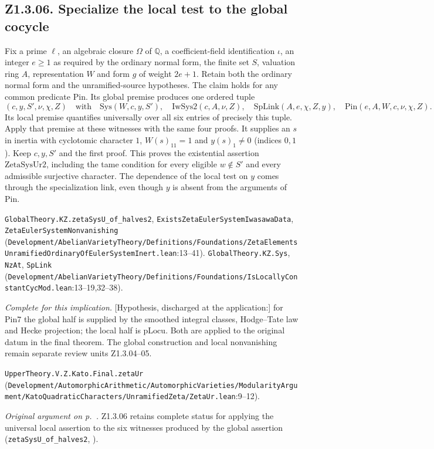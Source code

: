 \subsection{Z1.3.06. Specialize the local test to the global cocycle}\label{r5:Z1.3.06}
Fix a prime $\ell$, an algebraic closure $\Omega$ of $\mathbb Q$, a coefficient-field identification $\iota$, an integer $e\ge1$ as required by the ordinary normal form, the finite set $S$, valuation ring $A$, representation $W$ and form $g$ of weight $2e+1$. Retain both the ordinary normal form and the unramified-source hypotheses. The claim holds for any common predicate $\mathrm{Pin}$. Its global premise produces one ordered tuple
\[
 (c,y,S',\nu,\chi,Z)
 \quad\text{with}\quad
 \mathrm{Sys}(W,c,y,S'),\quad\mathrm{IwSys2}(c,A,\nu,Z),\quad
 \mathrm{SpLink}(A,e,\chi,Z,y),\quad\mathrm{Pin}(e,A,W,c,\nu,\chi,Z).
\]
Its local premise quantifies universally over all six entries of precisely this tuple. Apply that premise at these witnesses with the same four proofs. It supplies an $s$ in inertia with cyclotomic character $1$, $W(s)_{11}=1$ and $y(s)_1\ne0$ (indices $0,1$). Keep $c,y,S'$ and the first proof. This proves the existential assertion $\mathrm{ZetaSysUr2}$, including the tame condition for every eligible $w\notin S'$ and every admissible surjective character. The dependence of the local test on $y$ comes through the specialization link, even though $y$ is absent from the arguments of $\mathrm{Pin}$.

{\footnotesize \nolinkurl{GlobalTheory.KZ.zetaSysU_of_halves2}, \nolinkurl{ExistsZetaEulerSystemIwasawaData}, \nolinkurl{ZetaEulerSystemNonvanishing} (\nolinkurl{Development/AbelianVarietyTheory/Definitions/Foundations/ZetaElementsUnramifiedOrdinaryOfEulerSystemInert.lean}\allowbreak:13--41). \nolinkurl{GlobalTheory.KZ.Sys}, \nolinkurl{NzAt}, \nolinkurl{SpLink} (\nolinkurl{Development/AbelianVarietyTheory/Definitions/Foundations/IsLocallyConstantCycMod.lean}\allowbreak:13--19,32--38).}

\emph{Complete for this implication.} [Hypothesis, discharged at the application:] for $\mathrm{Pin7}$ the global half is supplied by the smoothed integral classes, Hodge--Tate law and Hecke projection; the local half is $\mathrm{pLocu}$. Both are applied to the original datum in the final theorem. The global construction and local nonvanishing remain separate review units Z1.3.04--05.

{\footnotesize \nolinkurl{UpperTheory.V.Z.Kato.Final.zetaUr} (\nolinkurl{Development/AutomorphicArithmetic/AutomorphicVarieties/ModularityArgument/KatoQuadraticCharacters/UnramifiedZeta/ZetaUr.lean}\allowbreak:9--12).}

\label{r6:review:Z1.3.06} \emph{Original argument on p.~\pageref{r5:Z1.3.06}.} Z1.3.06 retains complete status for applying the universal local assertion to the six witnesses produced by the global assertion (\nolinkurl{zetaSysU_of_halves2}, ).

